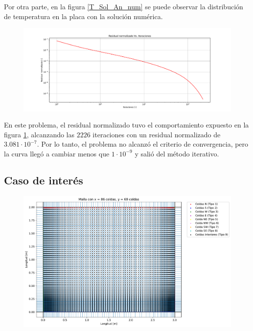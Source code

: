 \documentclass[article,latterpaper]{IEEEtran}
\begin{document}
Por otra parte, en la figura \ref{T_Sol_An_num} se puede observar la distribución de temperatura en la placa con la solución numérica.

\begin{figure}[H]
    \centering
    \includegraphics[scale=0.2]{Caso_analitico/Residuales.pdf}
    \caption{ }
    \label{Res_An_num}
\end{figure}

En este problema, el residual normalizado tuvo el comportamiento expuesto en la figura \ref{Res_An_num}, alcanzando las $2226$ iteraciones con un residual normalizado de $3.081\cdot 10^{-7}$. Por lo tanto, el problema no alcanzó el criterio de convergencia, pero la curva llegó a cambiar menos que $1\cdot 10^{-9}$ y salió del método iterativo.

\subsection{Caso de interés}

\begin{figure}[H]
    \centering
    \includegraphics[scale=0.25]{Caso_interes/Malla.pdf}
    \caption{ }
    \label{Malla_int}
\end{figure}
\end{document}
